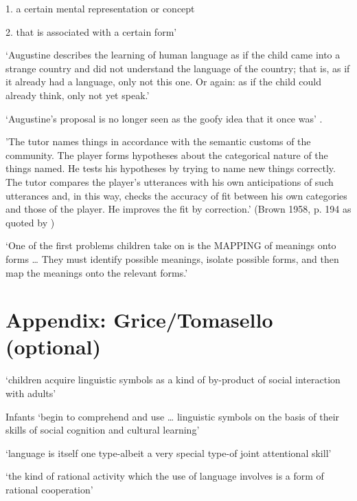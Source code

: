 \documentclass[12pt]{extarticle}
\begin{document}
\begin{multicols}{3}
1. a certain mental representation or concept 

2.	that is associated with a certain form’

\citep[p.\ 17]{Bloom:2000qz}
 
‘Augustine describes the learning of human language as if the child came into a strange country and did not understand the language of the country; that is, as if it already had a language, only not this one.  Or again: as if the child could already think, only not yet speak.’
\citep[15--16, §32]{Wittgenstein:1953mm}
 
‘Augustine’s proposal is no longer seen as the goofy idea that it once was’ \citep[p.\ 61]{Bloom:2000qz}.
 
'The tutor names things in accordance with the semantic customs of the community.  The player forms hypotheses about the categorical nature of the things named.  He tests his hypotheses by trying to name new things correctly.  The tutor compares the player's utterances with his own anticipations of such utterances and, in this way, checks the accuracy of fit between his own categories and those of the player.  He improves the fit by correction.'
(Brown 1958, p. 194 as quoted by \citep[p.\ 19]{Clark:1993bv})
 
‘One of the first problems children take on is the MAPPING of meanings onto forms …  They must identify possible meanings, isolate possible forms, and then map the meanings onto the relevant forms.’
\citep[p.\ 14]{Clark:1993bv}
 
 
 
 
 
 
\section{Appendix: Grice/Tomasello (optional)}
 
‘children acquire linguistic symbols as a kind of by-product of social interaction with adults’
\citep[p.\ 90]{Tomasello:2003fk}
 
Infants ‘begin to comprehend and use … linguistic symbols on the basis of their skills of social cognition and cultural learning’
\citep[p.\ 582]{Tomasello:1999en}
 
‘language is itself one type-albeit a very special type-of joint attentional skill’
\citep[p.\ 1120]{Tomasello:2001ic}
 
‘the kind of rational activity which the use of language involves is a form of rational cooperation’
\citep[p.\ 341]{Grice:1989ha}
 

\end{multicols}
\end{document}
